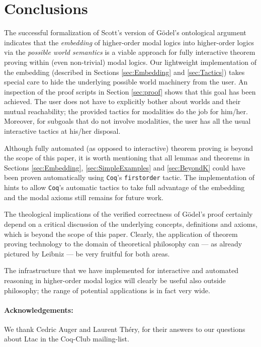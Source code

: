 \documentclass{llncs}
\newcommand{\Coq}{\texttt{Coq}\xspace}
\begin{document}
\section{Conclusions}
\label{sec:conclusions}

The successful formalization of Scott's version of  G\"odel's
ontological argument indicates that the \emph{embedding} of
higher-order modal
logics into higher-order logics via the \emph{possible world
semantics} is a viable approach for fully interactive theorem proving
within (even non-trivial) modal logics. Our lightweight implementation of the embedding
(described in Sections \ref{sec:Embedding} and \ref{sec:Tactics})
takes special care to hide the underlying possible world machinery
from the user. An inspection of the proof scripts in Section
\ref{sec:proof} shows that this goal has been achieved. The user does
not have to explicitly bother about worlds and their mutual
reachability; the provided tactics for modalities do the job for
him/her. Moreover, for subgoals that do not involve modalities, the
user has all the usual interactive tactics at his/her disposal.

Although fully automated (as opposed to interactive) theorem proving
is beyond the scope of this paper, it is worth mentioning that all
lemmas and theorems in Sections \ref{sec:Embedding},
\ref{sec:SimpleExamples} and \ref{sec:BeyondK} could have been proven
automatically using \Coq's \texttt{firstorder} tactic. The
implementation of hints to allow \Coq's automatic tactics to take full
advantage of the embedding and the modal axioms still remains for
future work. 

The theological implications of the verified correctness of Gödel's
proof certainly depend on a critical discussion of the underlying
concepts, definitions and axioms, which is beyond the scope of this
paper.  Clearly, the application of theorem proving technology to the
domain of theoretical philosophy can --- as already pictured by
Leibniz --- be very fruitful for both areas. 

The infrastructure that we have implemented for interactive and
automated reasoning in higher-order modal logics will clearly be
useful also outside philosophy; the range of potential applications is
in fact 
very wide.




\paragraph{Acknowledgements:} We thank Cedric Auger and Laurent Théry, 
for their answers to our questions about Ltac in the Coq-Club mailing-list. 
\end{document}
